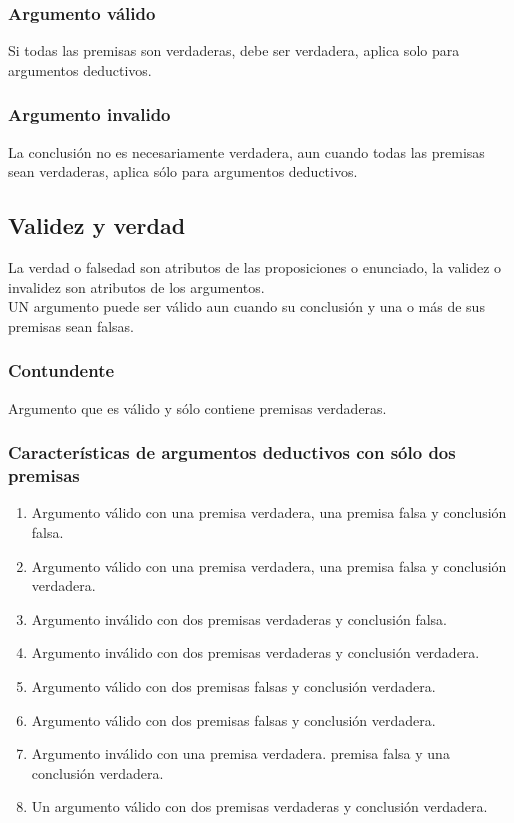 \documentclass[10pt]{book} 						%
\begin{document}
\subsubsection{Argumento válido}
Si todas las premisas son verdaderas, debe ser verdadera, aplica solo para argumentos deductivos.
\subsubsection{Argumento invalido}
La conclusión no es necesariamente verdadera, aun cuando todas las premisas sean verdaderas, aplica sólo para argumentos deductivos.
\subsection{Validez y verdad}
La verdad o falsedad son atributos de las proposiciones o enunciado, la validez o invalidez son atributos de los argumentos.\\
UN argumento puede ser válido aun cuando su conclusión y una o más de sus premisas sean falsas.
\subsubsection{Contundente}
Argumento que es válido y sólo contiene premisas verdaderas.
\subsubsection{Características de argumentos deductivos con sólo dos premisas}
\begin{enumerate}
\item Argumento válido con una premisa verdadera, una premisa falsa y conclusión falsa.
\item Argumento válido con una premisa verdadera, una premisa falsa y conclusión verdadera.
\item Argumento inválido con dos premisas verdaderas y conclusión falsa.
\item Argumento inválido con dos premisas verdaderas y conclusión verdadera.
\item Argumento válido con dos premisas falsas y conclusión verdadera.
\item Argumento válido con dos premisas falsas y conclusión verdadera.
\item Argumento inválido con una premisa verdadera. premisa falsa y una conclusión verdadera.
\item Un argumento válido con dos premisas verdaderas y conclusión verdadera.
\end{enumerate}
\end{document}
